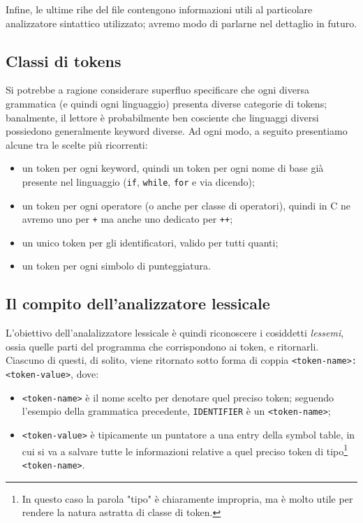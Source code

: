 \documentclass[class=book, crop=false, oneside, 12pt]{standalone}
\begin{document}
Infine, le ultime rihe del file contengono informazioni utili al particolare analizzatore sintattico utilizzato; avremo modo di parlarne nel dettaglio in futuro.

\subsection{Classi di tokens}
Si potrebbe a ragione considerare superfluo specificare che ogni diversa grammatica (e quindi ogni linguaggio) presenta diverse categorie di tokens; banalmente, il lettore è probabilmente ben cosciente che linguaggi diversi possiedono generalmente keyword diverse. Ad ogni modo, a seguito presentiamo alcune tra le scelte più ricorrenti:
\begin{itemize}
    \item un token per ogni keyword, quindi un token per ogni nome di base già presente nel linguaggio (\texttt{if}, \texttt{while}, \texttt{for} e via dicendo);
    \item un token per ogni operatore (o anche per classe di operatori), quindi in C ne avremo uno per \texttt{+} ma anche uno dedicato per \texttt{++}; 
    \item un unico token per gli identificatori, valido per tutti quanti;
    \item un token per ogni simbolo di punteggiatura. 
\end{itemize}

\subsection{Il compito dell'analizzatore lessicale}
L'obiettivo dell'analalizzatore lessicale è quindi riconoscere i cosiddetti \emph{lessemi}, ossia quelle parti del programma che corrispondono ai token, e ritornarli. Ciascuno di questi, di solito, viene ritornato sotto forma di coppia \texttt{<token-name>: <token-value>}, dove:
\begin{itemize}
    \item \texttt{<token-name>} è il nome scelto per denotare quel preciso token; seguendo l'esempio della grammatica precedente, \texttt{IDENTIFIER} è un \texttt{<token-name>};
    \item \texttt{<token-value>} è tipicamente un puntatore a una entry della symbol table, in cui si va a salvare tutte le informazioni relative a quel preciso token di tipo\footnote{In questo caso la parola "tipo" è chiaramente impropria, ma è molto utile per rendere la natura astratta di classe di token.} \texttt{<token-name>}.
\end{itemize}
\end{document}
